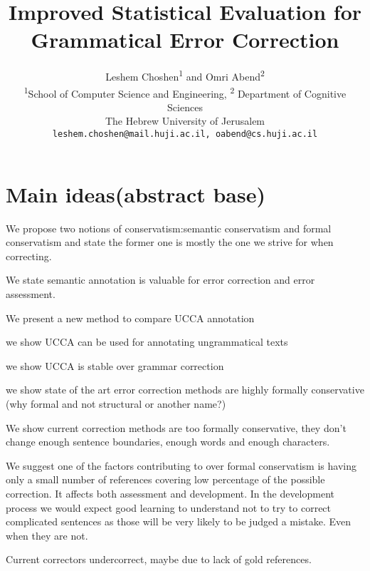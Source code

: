 \documentclass[english]{article}
\begin{document}
\title{Improved Statistical Evaluation for Grammatical Error Correction}

\author{
  Leshem Choshen\textsuperscript{1} and Omri Abend\textsuperscript{2} \\
  \textsuperscript{1}School of Computer Science and Engineering, \textsuperscript{2} Department of Cognitive Sciences \\
  The Hebrew University of Jerusalem \\
  \texttt{leshem.choshen@mail.huji.ac.il, oabend@cs.huji.ac.il}\\
}



\maketitle


\section{Main ideas(abstract base)}

We propose two notions of conservatism:semantic conservatism and formal
conservatism and state the former one is mostly the one we strive
for when correcting.

We state semantic annotation is valuable for error correction and
error assessment.

We present a new method to compare UCCA annotation

we show UCCA can be used for annotating ungrammatical texts

we show UCCA is stable over grammar correction

we show state of the art error correction methods are highly formally
conservative (why formal and not structural or another name?)

We show current correction methods are too formally conservative,
they don't change enough sentence boundaries, enough words and enough
characters.

We suggest one of the factors contributing to over formal conservatism
is having only a small number of references covering low percentage
of the possible correction. It affects both assessment and development.
In the development process we would expect good learning to understand
not to try to correct complicated sentences as those will be very
likely to be judged a mistake. Even when they are not.

Current correctors undercorrect, maybe due to lack of gold references.
\end{document}

